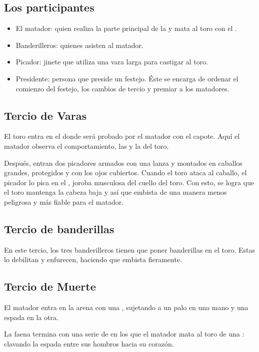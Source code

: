 \subsection*{Los participantes}
%
\begin{itemize}
%
\item El matador: quien realiza la parte principal de la  y mata al toro con el .
%
\item Banderilleros: quienes asisten al matador.
%
\item Picador: jinete que utiliza una vara larga para castigar al toro.
%
\item Presidente: persona que preside un festejo. Éste se encarga de ordenar el comienzo del festejo, los cambios de tercio y premiar a los matadores.
%
\end{itemize}


\subsection*{Tercio de Varas}
%
El toro entra en el  donde será probado por el matador con el capote. Aquí el matador observa el comportamiento, las  y la  del toro.

Después, entran dos picadores armados con una lanza y montados en caballos grandes, protegidos y con los ojos cubiertos. Cuando el toro ataca al caballo, el picador lo pica en el , joroba musculosa del cuello del toro. Con esto, se logra que el toro mantenga la cabeza baja y así que embista de una manera menos peligrosa y más fiable para el matador.


\subsection*{Tercio de banderillas}
%
En este tercio, los tres banderilleros tienen que poner banderillas en el toro. Estas lo debilitan y enfurecen, haciendo que embista fieramente.


\subsection*{Tercio de Muerte}
%
El matador entra en la arena con una , sujetando a un palo en una mano y una espada en la otra. 

La faena termina con una serie de  en los que el matador mata al toro de una : clavando la espada entre sus hombros hacia su corazón.

